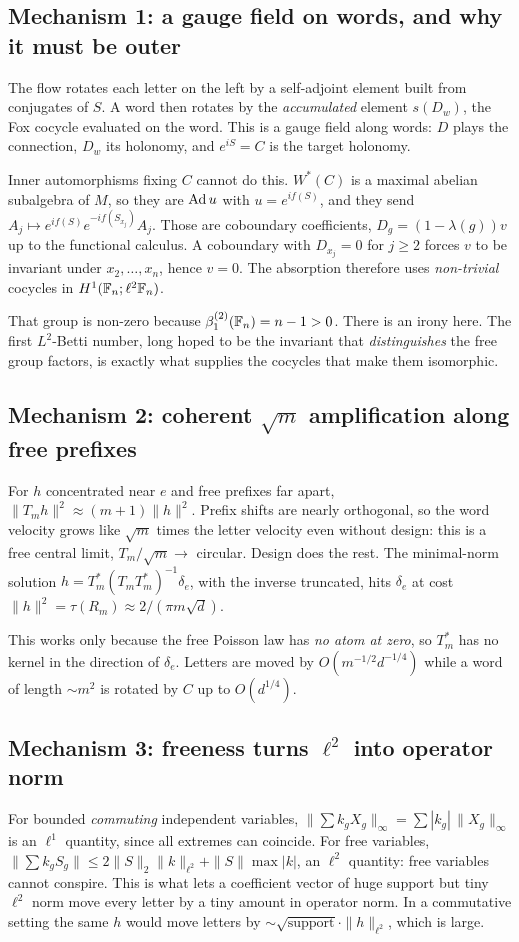 \label{sec:essence}
\subsection{Mechanism 1: a gauge field on words, and why it must be outer}
The flow rotates each letter on the left by a self-adjoint element built from conjugates of $S$. A word then rotates by the
\emph{accumulated} element $s(D_w)$, the Fox cocycle evaluated on the word. This is a gauge field along words: $D$ plays the connection, $D_w$ its
holonomy, and $e^{iS}=C$ is the target holonomy.

Inner automorphisms fixing $C$ cannot do this. $W^*(C)$ is a maximal abelian subalgebra of $M$, so they are $\operatorname{Ad} u$ with $u=e^{if(S)}$, and they
send $A_j\mapsto e^{if(S)}e^{-if(S_{x_j})}A_j$. Those are coboundary coefficients, $D_g=(1-\lambda(g))v$ up to the functional calculus. A coboundary with
$D_{x_j}=0$ for $j\ge2$ forces $v$ to be invariant under $x_2,\dots,x_n$, hence $v=0$. The absorption therefore uses \emph{non-trivial} cocycles in
$H^1(\mathbb F_n;\ell^2\mathbb F_n)$.

That group is non-zero because $\beta^{(2)}_1(\mathbb F_n)=n-1>0$. There is an irony here. The first $L^2$-Betti number, long hoped to be the invariant that
\emph{distinguishes} the free group factors, is exactly what supplies the cocycles that make them isomorphic.

\subsection{Mechanism 2: coherent $\sqrt m$ amplification along free prefixes}
For $h$ concentrated near $e$ and free prefixes far apart, $\|T_mh\|^2\approx(m+1)\|h\|^2$. Prefix shifts are nearly orthogonal, so the word velocity
grows like $\sqrt m$ times the letter velocity even without design: this is a free central limit, $T_m/\sqrt m\to$ circular. Design does the rest. The
minimal-norm solution $h=T_m^*(T_mT_m^*)^{-1}\delta_e$, with the inverse truncated, hits $\delta_e$ at cost $\|h\|^2=\tau(R_m)\approx2/(\pi m\sqrt d)$.

This works only because the free Poisson law has \emph{no atom at zero}, so $T_m^*$ has no kernel in the direction of $\delta_e$. Letters are moved by
$O(m^{-1/2}d^{-1/4})$ while a word of length $\sim m^2$ is rotated by $C$ up to $O(d^{1/4})$.

\subsection{Mechanism 3: freeness turns $\ell^2$ into operator norm}
For bounded \emph{commuting} independent variables, $\|\sum k_gX_g\|_\infty=\sum|k_g|\,\|X_g\|_\infty$ is an $\ell^1$ quantity, since all extremes can coincide. For free
variables, $\|\sum k_gS_g\|\le2\|S\|_2\|k\|_{\ell^2}+\|S\|\max|k|$, an $\ell^2$ quantity: free variables cannot conspire. This is what lets a coefficient vector of huge
support but tiny $\ell^2$ norm move every letter by a tiny amount in operator norm. In a commutative setting the same $h$ would move letters by
$\sim\sqrt{\text{support}}\cdot\|h\|_{\ell^2}$, which is large.

